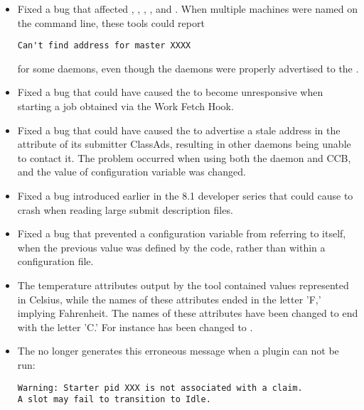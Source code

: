 \begin{itemize}

\item Fixed a bug that affected , , ,
, and . 
When multiple machines were named on the command line, 
these tools could report 
\begin{verbatim}
Can't find address for master XXXX 
\end{verbatim}
for some daemons,
even though the daemons were properly advertised to the .

\item Fixed a bug that could have caused the  to become 
unresponsive when starting a job obtained via the Work Fetch Hook.

\item Fixed a bug that could have caused the  to advertise a 
stale address in the  attribute of its submitter ClassAds,
resulting in other daemons being unable to contact it.
The problem occurred when using both the  daemon and CCB,
and the value of configuration variable  was changed.

\item Fixed a bug introduced earlier in the 8.1 developer series that 
could cause  to crash when reading 
large submit description files.

\item Fixed a bug that prevented a configuration variable 
from referring to itself,
when the previous value was defined by the code,
rather than within a configuration file.

\item The temperature attributes output by the  tool
contained values represented in Celsius, while
the names of these attributes ended in the letter 'F,' implying Fahrenheit.
The names of these attributes have been changed to end with the letter 'C.' 
For instance  has been changed to .

\item The  no longer generates this erroneous message
when a plugin can not be run:
\begin{verbatim}
Warning: Starter pid XXX is not associated with a claim.
A slot may fail to transition to Idle.
\end{verbatim}

\end{itemize}

